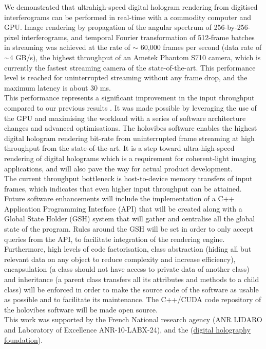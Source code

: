 We demonstrated that ultrahigh-speed digital hologram rendering from digitised interferograms can be performed in real-time with a commodity computer and GPU. Image rendering by propagation of the angular spectrum of 256-by-256-pixel interferograms, and temporal Fourier transformation of 512-frame batches in streaming was achieved at the rate of $\sim$ 60,000 frames per second (data rate of $\sim$4 GB/s), the highest throughput of an Ametek Phantom S710 camera, which is currently the fastest streaming camera of the state-of-the-art. This performance level is reached for uninterrupted streaming without any frame drop, and the maximum latency is about 30 ms.\\

This performance represents a significant improvement in the input throughput compared to our previous results \cite{samson2011video, Bencteux2015Holographic, Puyo2020Realtime}. It was made possible by leveraging the use of the GPU and maximising the workload with a series of software architecture changes and advanced optimisations. The holovibes software enables the highest digital hologram rendering bit-rate from uninterrupted frame streaming at high throughput from the state-of-the-art. It is a step toward ultra-high-speed rendering of digital holograms which is a requirement for coherent-light imaging applications, and will also pave the way for actual product development.\\

The current throughput bottleneck is host-to-device memory transfers of input frames, which indicates that even higher input throughput can be attained. Future software enhancements will include the implementation of a C++ Application Programming Interface (API) that will be created along with a Global State Holder (GSH) system that will gather and centralise all the global state of the program. Rules around the GSH will be set in order to only accept queries from the API, to facilitate integration of the rendering engine.\\

Furthermore, high levels of code factorisation, class abstraction (hiding all but relevant data on any object to reduce complexity and increase efficiency), encapsulation (a class should not have access to private data of another class) and inheritance (a parent class transfers all its attributes and methods to a child class) will be enforced in order to make the source code of the software as usable as possible and to facilitate its maintenance. The C++/CUDA code repository of the holovibes software will be made open source.\\

This work was supported by the French National research agency (ANR LIDARO and Laboratory of Excellence ANR-10-LABX-24), and the (\href{http://www.digitalholography.org}{digital holography foundation}).